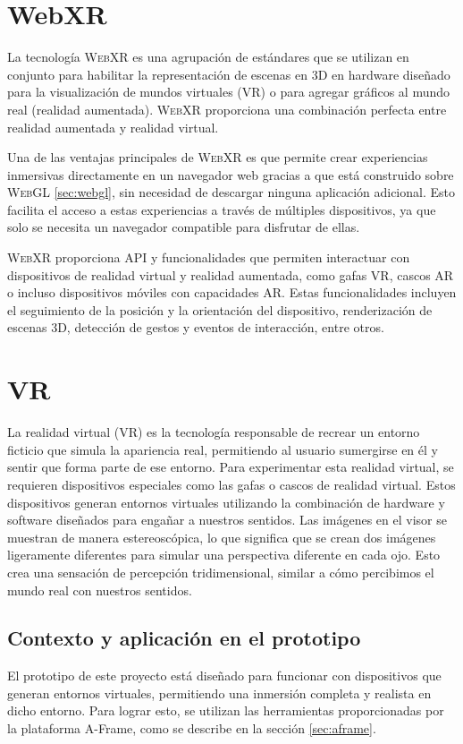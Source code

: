 \documentclass[a4paper, 11pt]{book}
\begin{document}
\section{WebXR}
La tecnología \textsc{WebXR} es una agrupación de estándares que se utilizan en conjunto para habilitar la representación de escenas en 3D en hardware diseñado para la visualización de mundos virtuales (VR) o para agregar gráficos al mundo real (realidad aumentada). \textsc{WebXR} proporciona una combinación perfecta entre realidad aumentada y realidad virtual.

Una de las ventajas principales de \textsc{WebXR} es que permite crear experiencias inmersivas directamente en un navegador web gracias a que está construido sobre \textsc{WebGL} \ref{sec:webgl}, sin necesidad de descargar ninguna aplicación adicional. Esto facilita el acceso a estas experiencias a través de múltiples dispositivos, ya que solo se necesita un navegador compatible para disfrutar de ellas.

\textsc{WebXR} proporciona \textsc{API} y funcionalidades que permiten interactuar con dispositivos de realidad virtual y realidad aumentada, como gafas \textsc{VR}, cascos \textsc{AR} o incluso dispositivos móviles con capacidades \textsc{AR}. Estas funcionalidades incluyen el seguimiento de la posición y la orientación del dispositivo, renderización de escenas \textsc{3D}, detección de gestos y eventos de interacción, entre otros.

\section{VR}
La realidad virtual (\textsc{VR}) es la tecnología responsable de recrear un entorno ficticio que simula la apariencia real, permitiendo al usuario sumergirse en él y sentir que forma parte de ese entorno. Para experimentar esta realidad virtual, se requieren dispositivos especiales como las gafas o cascos de realidad virtual. Estos dispositivos generan entornos virtuales utilizando la combinación de hardware y software diseñados para engañar a nuestros sentidos. Las imágenes en el visor se muestran de manera estereoscópica, lo que significa que se crean dos imágenes ligeramente diferentes para simular una perspectiva diferente en cada ojo. Esto crea una sensación de percepción tridimensional, similar a cómo percibimos el mundo real con nuestros sentidos.
\subsection{Contexto y aplicación en el prototipo}
El prototipo de este proyecto está diseñado para funcionar con dispositivos que generan entornos virtuales, permitiendo una inmersión completa y realista en dicho entorno. Para lograr esto, se utilizan las herramientas proporcionadas por la plataforma A-Frame, como se describe en la sección \ref{sec:aframe}. 
\end{document}
